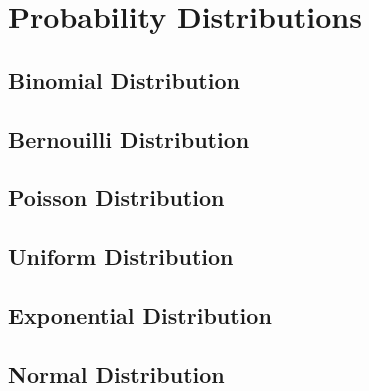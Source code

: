\documentclass{article}
\begin{document}
\section{Probability Distributions}
\begin{definition}[Expectation]
    
\end{definition}
\begin{definition}[Variance]
    
\end{definition}
\subsection{Binomial Distribution}
\subsection{Bernouilli Distribution}
\subsection{Poisson Distribution}
\subsection{Uniform Distribution}
\subsection{Exponential Distribution}
\subsection{Normal Distribution}
\end{document}
